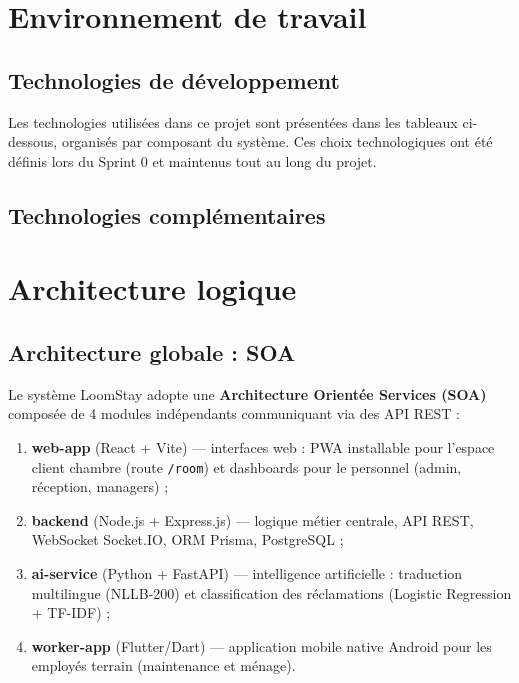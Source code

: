 \section{Environnement de travail}
\label{sec:environnement}

\subsection{Technologies de développement}

Les technologies utilisées dans ce projet sont présentées dans les tableaux ci-dessous, organisés par composant du système. Ces choix technologiques ont été définis lors du Sprint 0 et maintenus tout au long du projet.



\subsection{Technologies complémentaires}



\section{Architecture logique}
\label{sec:architecture}

\subsection{Architecture globale : SOA}

Le système LoomStay adopte une \textbf{Architecture Orientée Services (SOA)} composée de 4 modules indépendants communiquant via des API REST :

\begin{enumerate}
  \item \textbf{web-app} (React + Vite) — interfaces web : PWA installable pour l'espace client chambre (route \texttt{/room}) et dashboards pour le personnel (admin, réception, managers) ;
  \item \textbf{backend} (Node.js + Express.js) — logique métier centrale, API REST, WebSocket Socket.IO, ORM Prisma, PostgreSQL ;
  \item \textbf{ai-service} (Python + FastAPI) — intelligence artificielle : traduction multilingue (NLLB-200) et classification des réclamations (Logistic Regression + TF-IDF) ;
  \item \textbf{worker-app} (Flutter/Dart) — application mobile native Android pour les employés terrain (maintenance et ménage).
\end{enumerate}

